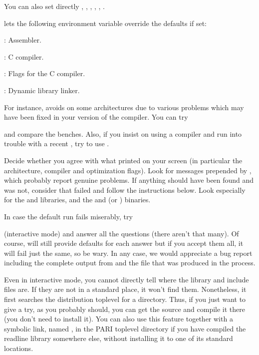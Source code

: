 
\noindent You can also set directly , ,
, , , .

  lets the following
environment variable override the defaults if set:

: Assembler.

: C compiler.

: Flags for the C compiler.

: Dynamic library linker.

\noindent For instance,  avoids  on some
architectures due to various problems which may have been fixed in your
version of the compiler. You can try


\noindent and compare the benches. Also, if you insist on using a 
compiler and run into trouble with a recent , try to use
.

 Decide whether you agree with what
 printed on your screen (in particular the architecture,
compiler and optimization flags). Look for messages prepended by
\kbd{\#\#\#}, which probably report genuine problems. If anything should have
been found and was not, consider that  failed and follow the
instructions below. Look especially for the  and 
libraries, and the  and  (or ) binaries.

In case the default  run fails miserably, try


\noindent (interactive mode) and answer all the questions (there aren't that
many). Of course,  will still provide defaults for each answer
but if you accept them all, it will fail just the same, so be wary. In any
case, we would appreciate a bug report including the complete output from
 and the file  that was produced in
the process.

Even in interactive mode, you cannot directly tell 
where the  library and include files are. If they are not in a
standard place, it won't find them. Nonetheless, it first searches the
distribution toplevel for a  directory. Thus, if you just want
to give  a try, as you probably should, you can get the source
and compile it there (you don't need to install it). You can also use this
feature together with a symbolic link, named , in the PARI
toplevel directory if you have compiled the readline library somewhere else,
without installing it to one of its standard locations. 

